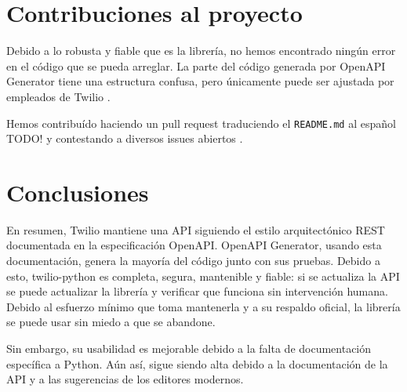\documentclass{article}
\begin{document}
\section{Contribuciones al proyecto}

Debido a lo robusta y fiable que es la librería,
no hemos encontrado ningún error en el código que se pueda arreglar.
La parte del código generada por OpenAPI Generator
tiene una estructura confusa,
pero únicamente puede ser ajustada por empleados de Twilio \cite{contributing}.

Hemos contribuído haciendo un pull request
traduciendo el \verb|README.md| al español TODO!
\cite{contribución-readme}
y contestando a diversos issues abiertos
\cite{contribución-repeated-code}
\cite{contribución-security-improvements}
\cite{contribución-wrong-login}.

\section{Conclusiones}

En resumen,
Twilio mantiene una API siguiendo el estilo arquitectónico REST
documentada en la especificación OpenAPI.
OpenAPI Generator, usando esta documentación,
genera la mayoría del código junto con sus pruebas.
Debido a esto,
twilio-python es completa, segura, mantenible y fiable:
si se actualiza la API
se puede actualizar la librería
y verificar que funciona sin intervención humana.
Debido al esfuerzo mínimo que toma mantenerla
y a su respaldo oficial,
la librería se puede usar sin miedo a que se abandone.

Sin embargo, su usabilidad es mejorable
debido a la falta de documentación específica a Python.
Aún así, sigue siendo alta debido a la documentación de la API
y a las sugerencias de los editores modernos.

\newpage

\printbibliography
\end{document}
